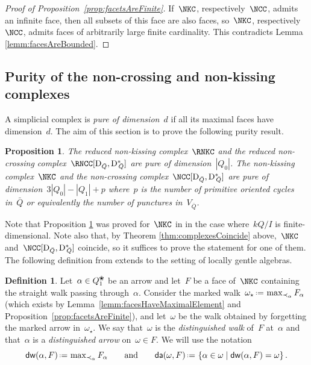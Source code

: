 \documentclass{amsart}
\newtheorem{proposition}[theorem]{Proposition}
\theoremstyle{definition}
\newtheorem{definition}[theorem]{Definition}
\newcommand{\set}[2]{\left\{ #1 \;\middle|\; #2 \right\}} %
\newcommand{\eqdef}{\mbox{\,\raisebox{0.2ex}{\scriptsize\ensuremath{\mathrm:}}\ensuremath{=}\,}} %
\newcommand{\darkblue}{\color{darkblue}} %
\newcommand{\defn}[1]{\textsl{\darkblue #1}} %
\newcommand{\blossom}{^\text{\ding{96}}} %
\newcommand{\distinguishedWalk}[2]{\mathsf{dw}(#1,#2)} %
\newcommand{\distinguishedArrows}[2]{\mathsf{da}(#1,#2)} %
\newcommand{\dual}{^*} %
\newcommand{\dissection}{\mathrm{D}} %
\begin{document}
\begin{proof}[Proof of Proposition~\ref{prop:facetsAreFinite}]
If~$\NKC$, respectively~$\NCC$, admits an infinite face, then all subsets of this face are also faces, so~$\NKC$, respectively~$\NCC$, admits faces of arbitrarily large finite cardinality.
This contradicts Lemma \ref{lemm:facesAreBounded}.
\end{proof}

\subsection{Purity of the non-crossing and non-kissing complexes}

A simplicial complex is \defn{pure of dimension~$d$} if all its maximal faces have dimension~$d$.
The aim of this section is to prove the following purity result.

\begin{proposition}
\label{prop:purity}
The reduced non-kissing complex~$\RNKC$ and the reduced non-crossing complex~$\RNCC[\dissection_{\bar Q}, {\dissection\dual\!\!_{\bar Q}}]$ are pure of dimension~$|Q_0|$.
The non-kissing complex~$\NKC$ and the non-crossing complex~$\NCC[\dissection_{\bar Q}, {\dissection\dual\!\!_{\bar Q}}]$ are pure of dimension~$3|Q_0| - |Q_1| + p$ where~$p$ is the number of primitive oriented cycles in~$\bar Q$ or equivalently the number of punctures in~$V_{\bar Q}$.
\end{proposition}

Note that Proposition \ref{prop:purity} was proved for~$\NKC$ in \cite[Cor.~2.29]{PaluPilaudPlamondon} in the case where~$kQ/I$ is finite-dimensional.
Note also that, by Theorem \ref{thm:complexesCoincide} above,~$\NKC$ and~$\NCC[\dissection_{\bar Q}, {\dissection\dual\!\!_{\bar Q}}]$ coincide, so it suffices to prove the statement for one of them.
The following definition from \cite[Def.~2.25]{PaluPilaudPlamondon} extends to the setting of locally gentle algebras.

\begin{definition}
\label{def:distinguishedWalksAndArrows}
Let~$\alpha \in Q\blossom_1$ be an arrow and let~$F$ be a face of~$\NKC$ containing the straight walk passing through~$\alpha$.
Consider the marked walk~$\omega_\star \eqdef \max_{\prec_\alpha} F_\alpha$ (which exists by Lemma~\ref{lemm:facesHaveMaximalElement} and Proposition~\ref{prop:facetsAreFinite}),
and let~$\omega$ be the walk obtained by forgetting the marked arrow in~$\omega_\star$. 
We say that~$\omega$ is the \defn{distinguished walk} of~$F$ at~$\alpha$ and that~$\alpha$ is a \defn{distinguished arrow} on~$\omega \in F$.
We will use the notation
\[
\distinguishedWalk{\alpha}{F} \eqdef \max\nolimits_{\prec_\alpha} F_\alpha
\qquad\text{and}\qquad
\distinguishedArrows{\omega}{F} \eqdef \set{\alpha \in \omega}{\distinguishedWalk{\alpha}{F} = \omega}.
\]
\end{definition}
\end{document}
